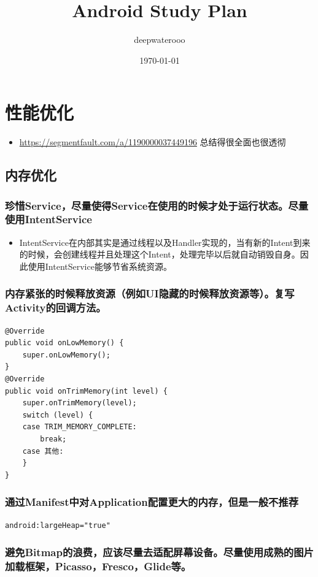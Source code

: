 \documentclass[9pt, b5paper]{article}
\author{deepwaterooo}
\date{\today}
\title{Android Study Plan}
\begin{document}
\maketitle
\tableofcontents


\section{性能优化}
\label{sec-1}
\begin{itemize}
\item \url{https://segmentfault.com/a/1190000037449196} 总结得很全面也很透彻
\end{itemize}
\subsection{内存优化}
\label{sec-1-1}
\subsubsection{珍惜Service，尽量使得Service在使用的时候才处于运行状态。尽量使用IntentService}
\label{sec-1-1-1}
\begin{itemize}
\item IntentService在内部其实是通过线程以及Handler实现的，当有新的Intent到来的时候，会创建线程并且处理这个Intent，处理完毕以后就自动销毁自身。因此使用IntentService能够节省系统资源。
\end{itemize}
\subsubsection{内存紧张的时候释放资源（例如UI隐藏的时候释放资源等）。复写Activity的回调方法。}
\label{sec-1-1-2}
\begin{verbatim}
@Override 
public void onLowMemory() { 
    super.onLowMemory(); 
}  
@Override 
public void onTrimMemory(int level) { 
    super.onTrimMemory(level);  
    switch (level) { 
    case TRIM_MEMORY_COMPLETE: 
        break; 
    case 其他: 
    } 
}
\end{verbatim}
\subsubsection{通过Manifest中对Application配置更大的内存，但是一般不推荐}
\label{sec-1-1-3}
\begin{verbatim}
android:largeHeap="true"
\end{verbatim}
\subsubsection{避免Bitmap的浪费，应该尽量去适配屏幕设备。尽量使用成熟的图片加载框架，Picasso，Fresco，Glide等。}
\label{sec-1-1-4}
\end{document}
